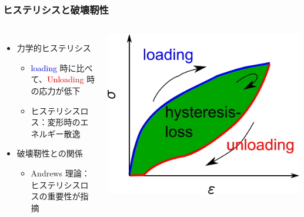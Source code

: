 \documentclass[12pt, dvipdfmx]{beamer}
\begin{document}
\begin{frame}[noframenumbering]
	\frametitle{ヒステリシスと破壊靭性}
	\begin{columns}[totalwidth=\linewidth]
			\begin{itemize}
				\item 力学的ヒステリシス
				\begin{itemize}
					\normalsize
					\item
					\textcolor{blue}{loading} 時に比べて、\textcolor{red}{Unloading} 時の応力が低下
					\item
					ヒステリシスロス：変形時のエネルギー散逸
				\end{itemize}
				\item 破壊靭性との関係
				\begin{itemize}
					\normalsize
					\item
					Andrews 理論：ヒステリシスロスの重要性が指摘
				\end{itemize}
			\end{itemize}
			\centering
			\includegraphics[width=\textwidth]{hysteresis_curve.png}
		\end{columns}
	
\end{frame}
\end{document}
